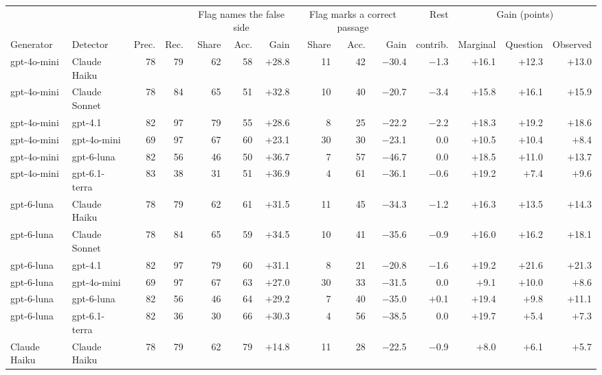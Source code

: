 \begin{table}[t]
\centering\scriptsize
\setlength{\tabcolsep}{3pt}
\begin{tabular}{llrrrrrrrrrrrr}
\toprule
& & & & \multicolumn{3}{c}{Flag names the false side} & \multicolumn{3}{c}{Flag marks a correct passage} & Rest & \multicolumn{3}{c}{Gain (points)} \\
\cmidrule(lr){5-7}\cmidrule(lr){8-10}\cmidrule(lr){12-14}
Generator & Detector & Prec. & Rec. & Share & Acc. & Gain & Share & Acc. & Gain & contrib. & Marginal & Question & Observed \\
\midrule
gpt-4o-mini & Claude Haiku & 78 & 79 & 62 & 58 & $+$28.8 & 11 & 42 & $-$30.4 & $-$1.3 & $+$16.1 & $+$12.3 & $+$13.0 \\
gpt-4o-mini & Claude Sonnet & 78 & 84 & 65 & 51 & $+$32.8 & 10 & 40 & $-$20.7 & $-$3.4 & $+$15.8 & $+$16.1 & $+$15.9 \\
gpt-4o-mini & gpt-4.1 & 82 & 97 & 79 & 55 & $+$28.6 & 8 & 25 & $-$22.2 & $-$2.2 & $+$18.3 & $+$19.2 & $+$18.6 \\
gpt-4o-mini & gpt-4o-mini & 69 & 97 & 67 & 60 & $+$23.1 & 30 & 30 & $-$23.1 & 0.0 & $+$10.5 & $+$10.4 & $+$8.4 \\
gpt-4o-mini & gpt-6-luna & 82 & 56 & 46 & 50 & $+$36.7 & 7 & 57 & $-$46.7 & 0.0 & $+$18.5 & $+$11.0 & $+$13.7 \\
gpt-4o-mini & gpt-6.1-terra & 83 & 38 & 31 & 51 & $+$36.9 & 4 & 61 & $-$36.1 & $-$0.6 & $+$19.2 & $+$7.4 & $+$9.6 \\
gpt-6-luna & Claude Haiku & 78 & 79 & 62 & 61 & $+$31.5 & 11 & 45 & $-$34.3 & $-$1.2 & $+$16.3 & $+$13.5 & $+$14.3 \\
gpt-6-luna & Claude Sonnet & 78 & 84 & 65 & 59 & $+$34.5 & 10 & 41 & $-$35.6 & $-$0.9 & $+$16.0 & $+$16.2 & $+$18.1 \\
gpt-6-luna & gpt-4.1 & 82 & 97 & 79 & 60 & $+$31.1 & 8 & 21 & $-$20.8 & $-$1.6 & $+$19.2 & $+$21.6 & $+$21.3 \\
gpt-6-luna & gpt-4o-mini & 69 & 97 & 67 & 63 & $+$27.0 & 30 & 33 & $-$31.5 & 0.0 & $+$9.1 & $+$10.0 & $+$8.6 \\
gpt-6-luna & gpt-6-luna & 82 & 56 & 46 & 64 & $+$29.2 & 7 & 40 & $-$35.0 & $+$0.1 & $+$19.4 & $+$9.8 & $+$11.1 \\
gpt-6-luna & gpt-6.1-terra & 82 & 36 & 30 & 66 & $+$30.3 & 4 & 56 & $-$38.5 & 0.0 & $+$19.7 & $+$5.4 & $+$7.3 \\
Claude Haiku & Claude Haiku & 78 & 79 & 62 & 79 & $+$14.8 & 11 & 28 & $-$22.5 & $-$0.9 & $+$8.0 & $+$6.1 & $+$5.7 \\

\end{tabular}
\end{table}
